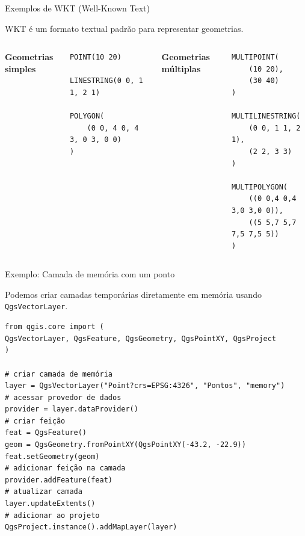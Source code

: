 \documentclass{beamer}
\begin{document}
\begin{frame}[fragile]{Exemplos de WKT (Well-Known Text)}
    
    WKT é um formato textual padrão para representar geometrias.
    
    \vspace{0.3cm}
    
    \begin{columns}
        
        \textbf{Geometrias simples}
        
        \begin{verbatim}
POINT(10 20)

LINESTRING(0 0, 1 1, 2 1)

POLYGON(
    (0 0, 4 0, 4 3, 0 3, 0 0)
)
        \end{verbatim}
        
        \textbf{Geometrias múltiplas}
        
        \begin{verbatim}
MULTIPOINT(
    (10 20),
    (30 40)
)

MULTILINESTRING(
    (0 0, 1 1, 2 1),
    (2 2, 3 3)
)

MULTIPOLYGON(
    ((0 0,4 0,4 3,0 3,0 0)),
    ((5 5,7 5,7 7,5 7,5 5))
)
        \end{verbatim}
        
    \end{columns}
    
\end{frame}

\begin{frame}[fragile]{Exemplo: Camada de memória com um ponto}
    
    Podemos criar camadas temporárias diretamente em memória usando \texttt{QgsVectorLayer}.
    
    \begin{verbatim}
from qgis.core import (
QgsVectorLayer, QgsFeature, QgsGeometry, QgsPointXY, QgsProject
)

# criar camada de memória
layer = QgsVectorLayer("Point?crs=EPSG:4326", "Pontos", "memory")
# acessar provedor de dados
provider = layer.dataProvider()
# criar feição
feat = QgsFeature()
geom = QgsGeometry.fromPointXY(QgsPointXY(-43.2, -22.9))
feat.setGeometry(geom)
# adicionar feição na camada
provider.addFeature(feat)
# atualizar camada
layer.updateExtents()
# adicionar ao projeto
QgsProject.instance().addMapLayer(layer)
    \end{verbatim}
    
\end{frame}
\end{document}
